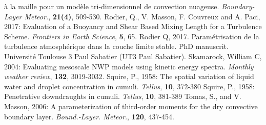 \`a la maille pour un mod\`ele tri-dimensionnel de convection nuageuse.
{\it  Boundary-Layer Meteor.}, {\bf 21(4)}, 509-530.
\decrefname
Rodier, Q., V. Masson, F. Couvreux and A. Paci, 2017: Evaluation of a Buoyancy and Shear Based Mixing Length for a Turbulence Scheme. {\it Frontiers in Earth Science}, {\bf 5}, 65.
\decrefname
Rodier Q, 2017. Param\'etrisation de la turbulence atmosph\'erique dans la couche limite stable. PhD manuscrit. Universit\'e Toulouse 3 Paul Sabatier (UT3 Paul Sabatier).
\decrefname
Skamarock, William C, 2004: Evaluating mesoscale NWP models using kinetic energy spectra.
{\it Monthly weather review}, {\bf 132}, 3019-3032.
\decrefname
Squire, P., 1958:
The spatial variation of liquid water and droplet concentration in cumuli.
{\it Tellus}, {\bf 10}, 372-380
\decrefname
Squire, P., 1958: Penetrative downdraughts in cumuli.
{\it Tellus}, {\bf 10}, 381-389
\decrefname
Tomas, S., and V. Masson, 2006: A parameterization of
third-order moments for the dry convective boundary layer. 
{\it Bound.-Layer. Meteor.}, {\bf 120}, 437-454.
